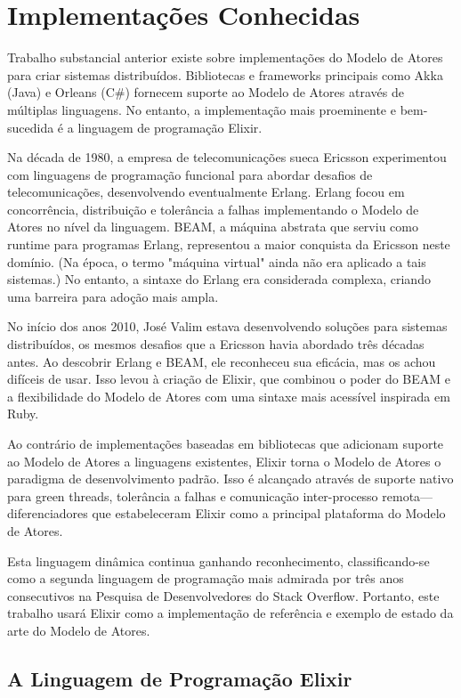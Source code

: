 \section{Implementações Conhecidas}

Trabalho substancial anterior existe sobre implementações do Modelo de Atores para criar sistemas distribuídos. Bibliotecas e frameworks principais como Akka (Java) e Orleans (C\#) fornecem suporte ao Modelo de Atores através de múltiplas linguagens. No entanto, a implementação mais proeminente e bem-sucedida é a linguagem de programação Elixir.

Na década de 1980, a empresa de telecomunicações sueca Ericsson experimentou com linguagens de programação funcional para abordar desafios de telecomunicações, desenvolvendo eventualmente Erlang. Erlang focou em concorrência, distribuição e tolerância a falhas implementando o Modelo de Atores no nível da linguagem. BEAM, a máquina abstrata que serviu como runtime para programas Erlang, representou a maior conquista da Ericsson neste domínio. (Na época, o termo "máquina virtual" ainda não era aplicado a tais sistemas.) No entanto, a sintaxe do Erlang era considerada complexa, criando uma barreira para adoção mais ampla.

No início dos anos 2010, José Valim estava desenvolvendo soluções para sistemas distribuídos, os mesmos desafios que a Ericsson havia abordado três décadas antes. Ao descobrir Erlang e BEAM, ele reconheceu sua eficácia, mas os achou difíceis de usar. Isso levou à criação de Elixir, que combinou o poder do BEAM e a flexibilidade do Modelo de Atores com uma sintaxe mais acessível inspirada em Ruby.

Ao contrário de implementações baseadas em bibliotecas que adicionam suporte ao Modelo de Atores a linguagens existentes, Elixir torna o Modelo de Atores o paradigma de desenvolvimento padrão. Isso é alcançado através de suporte nativo para green threads, tolerância a falhas e comunicação inter-processo remota—diferenciadores que estabeleceram Elixir como a principal plataforma do Modelo de Atores.

Esta linguagem dinâmica continua ganhando reconhecimento, classificando-se como a segunda linguagem de programação mais admirada por três anos consecutivos na Pesquisa de Desenvolvedores do Stack Overflow. Portanto, este trabalho usará Elixir como a implementação de referência e exemplo de estado da arte do Modelo de Atores.

\subsection{A Linguagem de Programação Elixir}

